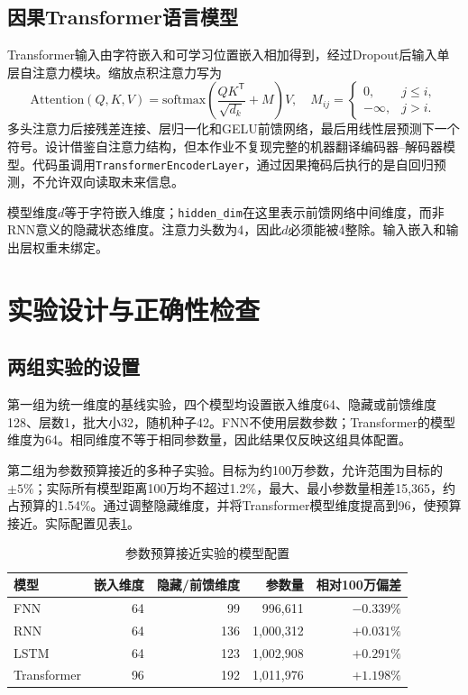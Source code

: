 ﻿\documentclass[UTF8,a4paper,12pt]{ctexart}
\begin{document}
\subsection{因果Transformer语言模型}
Transformer输入由字符嵌入和可学习位置嵌入相加得到，经过Dropout后输入单层自注意力模块。缩放点积注意力写为
\begin{equation}
 \mathrm{Attention}(Q,K,V)=\mathrm{softmax}\!\left(\frac{QK^{\mathsf T}}{\sqrt{d_k}}+M\right)V,
 \quad
 M_{ij}=\begin{cases}0,&j\le i,\\-\infty,&j>i.\end{cases}
\end{equation}
多头注意力后接残差连接、层归一化和GELU前馈网络，最后用线性层预测下一个符号。设计借鉴自注意力结构\cite{vaswani2017}，但本作业不复现完整的机器翻译编码器--解码器模型。代码虽调用\texttt{TransformerEncoderLayer}，通过因果掩码后执行的是自回归预测，不允许双向读取未来信息。

模型维度$d$等于字符嵌入维度；\texttt{hidden\_dim}在这里表示前馈网络中间维度，而非RNN意义的隐藏状态维度。注意力头数为4，因此$d$必须能被4整除。输入嵌入和输出层权重未绑定。

\section{实验设计与正确性检查}
\subsection{两组实验的设置}
第一组为统一维度的基线实验，四个模型均设置嵌入维度64、隐藏或前馈维度128、层数1，批大小32，随机种子42。FNN不使用层数参数；Transformer的模型维度为64。相同维度不等于相同参数量，因此结果仅反映这组具体配置。

第二组为参数预算接近的多种子实验。目标为约100万参数，允许范围为目标的$\pm5\%$；实际所有模型距离100万均不超过1.2\%，最大、最小参数量相差15,365，约占预算的1.54\%。通过调整隐藏维度，并将Transformer模型维度提高到96，使预算接近。实际配置见表\ref{tab:budget}。

\begin{table}[H]
\centering
\caption{参数预算接近实验的模型配置}
\label{tab:budget}
\begin{tabular}{lrrrr}
\toprule
模型 & 嵌入维度 & 隐藏/前馈维度 & 参数量 & 相对100万偏差\\
\midrule
FNN & 64 & 99 & 996,611 & $-0.339\%$\\
RNN & 64 & 136 & 1,000,312 & $+0.031\%$\\
LSTM & 64 & 123 & 1,002,908 & $+0.291\%$\\
Transformer & 96 & 192 & 1,011,976 & $+1.198\%$\\
\bottomrule
\end{tabular}
\end{table}
\end{document}
